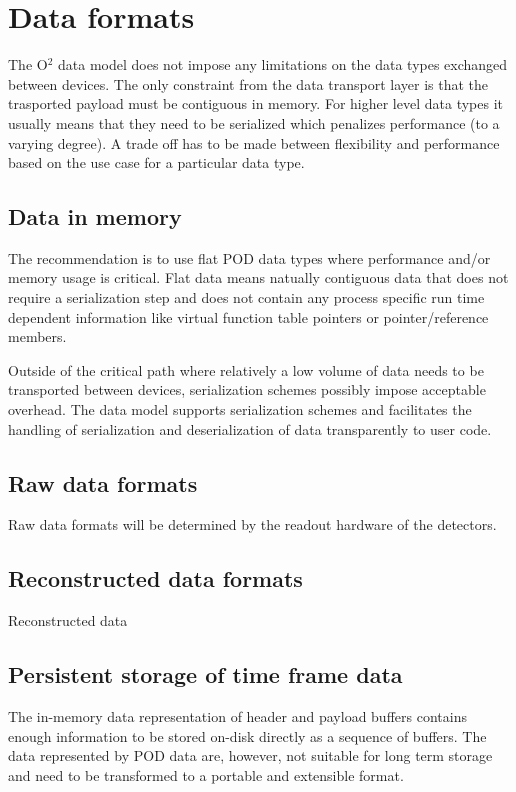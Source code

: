 \documentclass[a4paper,twoside]{article}
\def\O2{O$^2$}
\begin{document}
\section{Data formats}

The \O2 data model does not impose any limitations on the data types exchanged between devices. The only constraint from the data transport layer is that the trasported payload must be contiguous in memory. For higher level data types it usually means that they need to be serialized which penalizes performance (to a varying degree). A trade off has to be made between flexibility and performance based on the use case for a particular data type.

\subsection{Data in memory}
The recommendation is to use flat POD data types where performance and/or memory usage is critical. Flat data means natually contiguous data that does not require a serialization step and does not contain any process specific run time dependent information like virtual function table pointers or pointer/reference members.

Outside of the critical path where relatively a low volume of data needs to be transported between devices, serialization schemes possibly impose acceptable overhead. The data model supports serialization schemes and facilitates the handling of serialization and deserialization of data transparently to user code.

\subsection{Raw data formats}
Raw data formats will be determined by the readout hardware of the detectors.

\subsection{Reconstructed data formats}
Reconstructed data 

\subsection{Persistent storage of time frame data}
The in-memory data representation of header and payload buffers contains enough information to be stored on-disk directly as a sequence of buffers. The data represented by POD data are, however, not suitable for long term storage and need to be transformed to a portable and extensible format.
\end{document}

